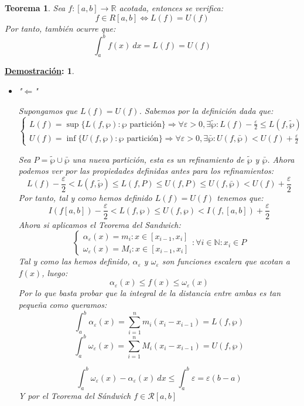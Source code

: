 \documentclass[10pt,a4paper,openright]{book}
\theoremstyle{break}
\newtheorem*{theo}{Teorema}
\newtheorem*{demo}{\underline{Demostración}:}
\newcommand{\dif}[1]{\ d#1}
\begin{document}
\begin{theo}
Sea $f:[a,b]\rightarrow \mathbb R$ acotada, entonces se verifica:
$$f\in R[a,b]\Leftrightarrow L(f) = U(f)$$
Por tanto, también ocurre que:
$$\int_{a}^{b} f(x)\dif{x} = L(f) = U(f)$$
\end{theo}
\begin{demo}
\begin{itemize}
\item "$\Leftarrow$"

Supongamos que $L(f)=U(f)$. Sabemos por la definición dada que:
$$\begin{cases} L(f) = \sup\{L(f, \wp) : \wp \mbox{ partición}\} \Rightarrow\forall \varepsilon > 0, \exists \tilde{\wp} : L(f) - \frac{\varepsilon}{2} \leq L(f,\tilde{\wp}) \\ U(f) = \inf\{U(f, \wp) : \wp \mbox{ partición}\}\Rightarrow \forall \varepsilon > 0, \exists \bar{\wp}: U(f, \bar{\wp}) < U(f) +\frac{\varepsilon}{2}\end{cases}$$

Sea $P = \tilde{\wp} \cup \bar{\wp}$ una nueva partición, esta es un refinamiento de $\tilde{\wp}$ y $\bar{\wp}$. Ahora podemos ver por las propiedades definidas antes para los refinamientos:
$$L(f) - \frac{\varepsilon}{2} < L(f, \tilde{\wp}) \leq L(f,P) \leq U(f,P) \leq U(f, \bar{\wp}) < U(f) + \frac{\varepsilon}{2} $$
Por tanto, tal y como hemos definido $L(f)=U(f)$ tenemos que:
$$I(f [a,b]) - \frac{\varepsilon}{2} < L(f,\wp) \leq U(f,\wp) < I(f, [a,b]) + \frac{\varepsilon}{2}$$
Ahora si aplicamos el Teorema del Sandwich:
$$\begin{cases} \alpha_\varepsilon (x) = m_i:x\in [x_{i-1}, x_i] \\ \omega_\varepsilon (x) = M_i:x\in [x_{i-1}, x_i] \end{cases}: \forall i \in \mathbb N: x_i\in P$$
Tal y como las hemos definido, $\alpha_\varepsilon$ y $\omega_\varepsilon$ son funciones escalera que acotan a $f(x)$, luego:
$$\alpha_\varepsilon (x) \leq f(x) \leq \omega_\varepsilon (x)$$
Por lo que basta probar que la integral de la distancia entre ambas es tan pequeña como queramos:
$$\int_{a}^{b} \alpha_\varepsilon (x) = \sum_{i=1}^{n} m_i (x_i - x_{i-1}) = L(f, \wp)$$
$$\int_{a}^{b} \omega_\varepsilon (x) = \sum_{i=1}^{n} M_i (x_i - x_{i-1}) = U(f, \wp)$$

$$\int_{a}^{b} \omega_\varepsilon (x) - \alpha_\varepsilon (x)\dif{x} \leq \int_{a}^{b} \varepsilon = \varepsilon (b-a)$$
Y por el Teorema del Sándwich $f\in \mathcal{R}[a,b]$


\end{itemize}
\end{demo}
\end{document}
